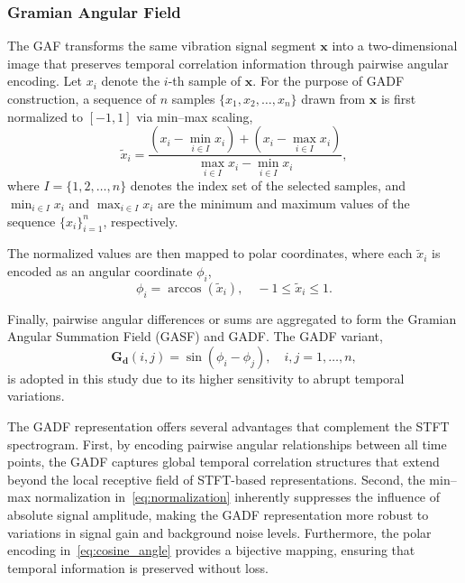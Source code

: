 \documentclass[pdflatex,sn-mathphys-num]{sn-jnl}
\theoremstyle{thmstyleone}%
\theoremstyle{thmstyletwo}%
\theoremstyle{thmstylethree}%
\begin{document}
\subsubsection{Gramian Angular Field}

The GAF transforms the same vibration signal segment $\boldsymbol{x}$ into a two-dimensional image that preserves temporal correlation information through pairwise angular encoding. Let $x_i$ denote the $i$-th sample of $\boldsymbol{x}$. For the purpose of GADF construction, a sequence of $n$ samples $\{x_1, x_2, \ldots, x_n\}$ drawn from $\boldsymbol{x}$ is first normalized to $[-1, 1]$ via min--max scaling,
\begin{equation}
\tilde{x}_i = \frac{\left(x_i - \min\limits_{i\in I} x_i\right) + \left(x_i - \max\limits_{i\in I} x_i\right)}
{\max\limits_{i\in I} x_i - \min\limits_{i\in I} x_i},
\label{eq:normalization}
\end{equation}
where $I = \{1, 2, \ldots, n\}$ denotes the index set of the selected samples, and $\min_{i\in I} x_i$ and $\max_{i\in I} x_i$ are the minimum and maximum values of the sequence $\{x_i\}_{i=1}^n$, respectively.

The normalized values are then mapped to polar coordinates, where each $\tilde{x}_i$ is encoded as an angular coordinate $\phi_i$,
\begin{equation}
\phi_i = \arccos(\tilde{x}_i), \quad -1 \leq \tilde{x}_i \leq 1.
\label{eq:cosine_angle}
\end{equation}

Finally, pairwise angular differences or sums are aggregated to form the Gramian Angular Summation Field (GASF) and GADF. The GADF variant,
\begin{equation}
\boldsymbol{G_d}(i,j) = \sin(\phi_i - \phi_j), \quad i,j = 1,\ldots,n,
\label{eq:gadf}
\end{equation}
is adopted in this study due to its higher sensitivity to abrupt temporal variations.

The GADF representation offers several advantages that complement the STFT spectrogram. First, by encoding pairwise angular relationships between all time points, the GADF captures global temporal correlation structures that extend beyond the local receptive field of STFT-based representations. Second, the min--max normalization in~\eqref{eq:normalization} inherently suppresses the influence of absolute signal amplitude, making the GADF representation more robust to variations in signal gain and background noise levels. Furthermore, the polar encoding in~\eqref{eq:cosine_angle} provides a bijective mapping, ensuring that temporal information is preserved without loss.
\end{document}
